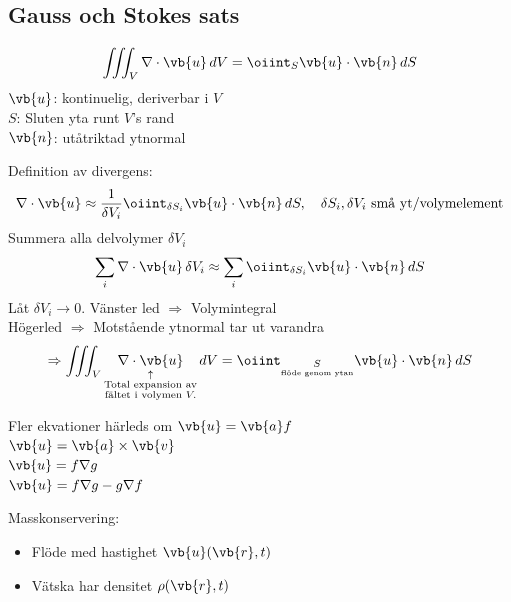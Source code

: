\subsection{Gauss och Stokes sats}

\begin{theorem}
\begin{minipage}{0.72\linewidth}
\[ \iiint_V \nabla \cdot \vb{u}\,dV = \oiint_S \vb{u} \cdot \vb{n}\,dS \]
$\vb{u}$: kontinuelig, deriverbar i $V$\\
$S$: Sluten yta runt $V$'s rand\\
$\vb{n}$: utåtriktad ytnormal
\end{minipage}
\begin{minipage}{0.26\linewidth}
\end{minipage}
\end{theorem}

Definition av divergens:
\[ \nabla \cdot \vb{u} \approx \frac{1}{\delta V_i} \oiint_{\delta S_i} \vb{u} \cdot \vb{n}\,dS, \quad \delta S_i, \delta V_i \text{ små yt/volymelement} \]
Summera alla delvolymer $\delta V_i$
\[ \sum_i \nabla \cdot \vb{u}\,\delta V_i \approx \sum_i \oiint_{\delta S_i} \vb{u} \cdot \vb{n}\,dS \]
Låt $\delta V_i \to 0$. Vänster led $\Rightarrow$ Volymintegral\\
\phantom{Låt $\delta V_i \to 0$.} Högerled $\Rightarrow$ Motstående ytnormal tar ut varandra
\[ \Rightarrow \iiint_V \underset{\substack{\uparrow \\ \text{Total expansion av} \\ \text{fältet i volymen } V.}}{\nabla \cdot \vb{u}}\,dV = \oiint_{\underset{\text{flöde genom ytan}}{S}} \vb{u} \cdot \vb{n}\,dS \]

Fler ekvationer härleds om $\vb{u} = \vb{a}f$\\
\phantom{Fler ekvationer härleds om} $\vb{u} = \vb{a} \times \vb{v}$\\
\phantom{Fler ekvationer härleds om} $\vb{u} = f\nabla g$\\
\phantom{Fler ekvationer härleds om} $\vb{u} = f\nabla g - g\nabla f$

Masskonservering:
\begin{itemize}
  \item Flöde med hastighet $\vb{u}(\vb{r}, t)$
  \item Vätska har densitet $\rho(\vb{r}, t)$
\end{itemize}

